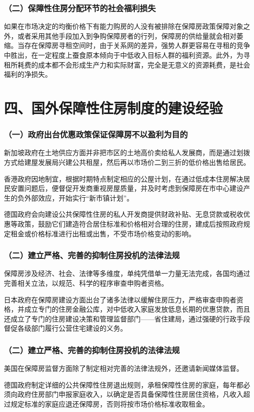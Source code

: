 \documentclass[aspectratio=169, 12pt]{beamer}
\begin{document}
\begin{frame}[plain]
    \frametitle{（二）保障性住房分配环节的社会福利损失}
    如果在市场决定的均衡价格下有能力购房的人没有被排除在保障房政策保障对象之外，或者采用其他手段加入到争购保障房者的行列，保障房的供给量就会相对萎缩。当存在保障房寻租空间时，由于关系网的差异，强势人群更容易在寻租的竞争中胜出，在一定程度上蚕食原本倾向于中低收入目标人群的福利资源。此外，为寻租所耗费的成本都不会形成生产力和实际财富，完全是无意义的资源耗费，是社会福利的净损失。
\end{frame}

\section{四、国外保障性住房制度的建设经验}

\begin{frame}[plain]
    \frametitle{（一）政府出台优惠政策保证保障房不以盈利为目的}
    新加坡政府在土地供应方面并非把市区的土地高价卖给私人发展商，而是通过划拨方式给建屋发展局兴建公共租屋，然后再以市场价二到三折的低价格出售给居民。
    \par
    香港政府因地制宜，根据时期特点制定相应的公屋计划，在通过低成本住房解决居民安置问题后，便督促开发商重视房屋质量，并及时考虑到保障房在市中心建设产生的负外部效应，开始实行“新市镇计划”。
    \par
    德国政府会向建设公共保障性住房的私人开发商提供财政补贴、无息贷款或税收优惠等政策，鼓励它们建造符合居住标准和价格相对合理的住房，建成后按照政府规定租金或价格标准进行出租或出售，不受市场价格变动的影响。
\end{frame}

\begin{frame}[plain]
    \frametitle{（二）建立严格、完善的抑制住房投机的法律法规}
    保障房涉及经济、社会、法律等多维度，单纯凭借单一力量无法完成，各国均通过完善相关立法，以规范、科学的程序审查申购者资格。
    \par
    日本政府在保障房建设方面出台了诸多法律以缓解住房压力，严格审查申购者资格，并成立专门的住房金融公库，对中低收入家庭发放低息长期的优惠贷款，而且还成立了专门的住房建设决策和管理监督部门——省住建局，通过强硬的行政手段督促各级部门履行公营住宅建设的义务。
\end{frame}

\begin{frame}[plain]
    \frametitle{（二）建立严格、完善的抑制住房投机的法律法规}
    美国在保障房监督方面除了制定相对完善的法律法规外，还邀请新闻媒体监督。
    \par
    德国政府制定详细的公共保障性住房退出规则，承租保障性住房的家庭，每年都必须向政府住房部门申报家庭收入，以确定是否具备保障性住房居住资格，凡收入超过规定标准的家庭应退还保障房，否则将按市场价格标准收取租金。
\end{frame}
\end{document}
